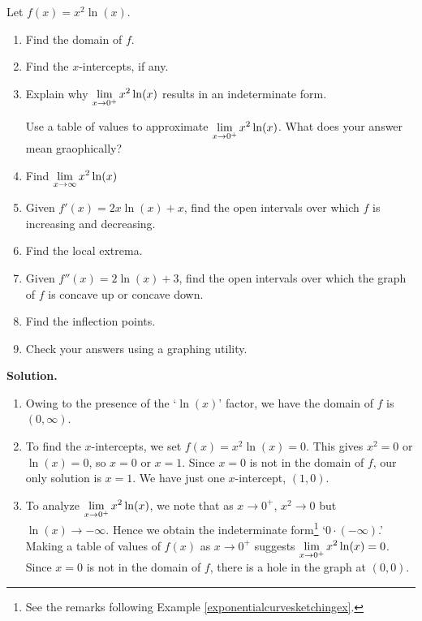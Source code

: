 \begin{ex}\label{logcurvesketchex} Let  $f(x) = x^2 \ln(x)$.

\begin{enumerate}

\item  Find the domain of $f$.

\item  Find the $x$-intercepts, if any.

\item Explain why $\displaystyle{ \lim_{x \rightarrow 0^{+}} x^2 \ln(x)}$ results in an indeterminate form.

Use a table of values  to approximate $\displaystyle{ \lim_{x \rightarrow 0^{+}} x^2 \ln(x)}$.  What does your answer mean graophically? 

\item  Find  $\displaystyle{ \lim_{x \rightarrow \infty} x^2 \ln(x)}$ 

\item  Given $f'(x) = 2x \ln(x) + x$, find the open intervals over which $f$ is increasing and decreasing.

\item  Find the local extrema.

\item  Given $f''(x) = 2 \ln(x) + 3$, find the open intervals over which the graph of $f$ is concave up or concave down.

\item Find the inflection points.

\item  Check your answers using a graphing utility.

\end{enumerate} 

{\bf Solution.}  

\begin{enumerate}

\item  Owing to the presence of the `$\ln(x)$' factor, we have the domain of $f$ is $(0, \infty)$.

\item  To find the $x$-intercepts, we set $f(x) = x^2 \ln(x) = 0$.  This gives $x^2 = 0$ or $\ln(x) = 0$, so $x = 0$ or $x = 1$.  Since $x=0$ is not in the domain of $f$, our only solution is $x = 1$. We have just one $x$-intercept, $(1,0)$.

\item   To analyze $\displaystyle{ \lim_{x \rightarrow 0^{+}} x^2 \ln(x)}$, we note that as $x \rightarrow 0^{+}$, $x^2 \rightarrow 0$ but $\ln(x) \rightarrow -\infty$.  Hence we obtain the indeterminate form\footnote{See the remarks following Example \ref{exponentialcurvesketchingex}.} `$0 \cdot (- \infty)$.'   Making a table of values of $f(x)$ as $x \rightarrow 0^{+}$ suggests  $\displaystyle{ \lim_{x \rightarrow 0^{+}} x^2 \ln(x) = 0}$.  Since $x = 0$ is not in the domain of $f$, there is a hole in the graph at $(0,0)$.


\end{enumerate}
\end{ex}
